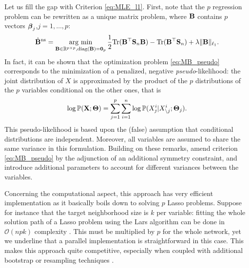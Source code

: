 Let us fill the gap with Criterion \eqref{eq:MLE_l1}. First, note that
the  $p$  regression problem  can  be  rewritten  as a  unique  matrix
problem, where $\mathbf{B}$ contains $p$ vectors $\boldsymbol\beta_j$,$j=1,\dots,p$:
\begin{equation}
  \label{eq:MB_pseudo}
  \hat\bB^{\text{ns}}  = \argmin_{\bB\in\Rset^{p\times  p}, \diag(\bB)
    =    \bzr_p}    \frac{1}{2}    \trace(\bB^\top\empcov    \bB)    -
  \trace(\bB^\top\empcov) + \lambda \|\bB\|_{\ell_1}.
\end{equation}
In          fact,          it           can          be          shown
\cite{2008_preprint_Rocha,2009_EJS_Chiquet,2010_AS_Ravikumar} that the
optimization   problem   \eqref{eq:MB_pseudo}   corresponds   to   the
minimization  of a  penalized, negative  \emph{pseudo}-likelihood: the
joint distribution  of $X$ is approximated  by the product of  the $p$
distributions of the $p$ variables conditional on the other ones, that
is
\begin{displaymath}
  \log \mathbb{P}(\mathbf{X};\boldsymbol\Theta) = \sum_{j=1}^p \sum_{i=1}^n
  \log \mathbb{P}(X_j^i|X_{\backslash j}^i;\boldsymbol\Theta_j).
\end{displaymath}
This  pseudo-likelihood  is based  upon  the  (false) assumption  that
conditional  distributions are  independent.  Moreover,  all variables
are assumed to share the  same variance in this formulation.  Building
on   these   remarks,   \cite{2008_preprint_Rocha}   amend   criterion
\eqref{eq:MB_pseudo}  by  the  adjunction of  an  additional  symmetry
constraint,  and  introduce  additional   parameters  to  account  for
different variances between the variables.

Concerning the computational aspect,  this approach has very efficient
implementation  as  it  basically  boils down  to  solving  $p$  Lasso
problems. Suppose  for instance that  the target neighborhood  size is
$k$ per variable:  fitting the whole solution path of  a Lasso problem
using  the  Lars  algorithm  can  be  done  in  $\mathcal{O}(n  p  k)$
complexity \cite{2012_FOT_bach}.   This must be multiplied  by $p$ for
the whole network, yet we  underline that a parallel implementation is
straightforward  in  this  case.    This  makes  this  approach  quite
competitive,  especially when  coupled  with  additional bootstrap  or
resampling techniques \cite{2010_JRSS_Meinshausen}.

